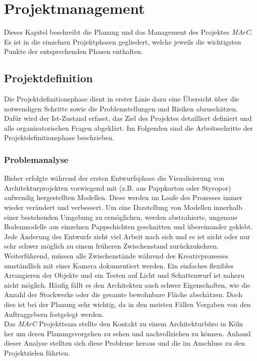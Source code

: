 \section{Projektmanagement} \label{sec:pm}

Dieses Kapitel beschreibt die Planung und das Management des Projektes \textit{MArC}. Es ist in die einzelnen Projektphasen gegliedert, welche jeweils die wichtigsten Punkte der entsprechenden Phasen enthalten.

\subsection{Projektdefinition}
Die Projektdefinitionsphase dient in erster Linie dazu eine Übersicht über die notwendigen Schritte sowie die Problemstellungen und Risiken abzuschätzen. Dafür wird der Ist-Zustand erfasst, das Ziel des Projektes detailliert definiert und alle organisatorischen Fragen abgeklärt. Im Folgenden sind die Arbeitsschritte der Projektdefinitionsphase beschrieben.
\subsubsection{Problemanalyse}
\label{sec:problemanalyse}
Bisher erfolgte während der ersten Entwurfsphase die Visualisierung von Architekturprojekten vorwiegend mit (z.B. aus Pappkarton oder Styropor) aufwendig hergestellten Modellen. Diese werden im Laufe des Prozesses immer wieder verändert und verbessert.
Um eine Darstellung von Modellen innerhalb einer bestehenden Umgebung zu ermöglichen, werden abstrahierte, ungenaue Bodenmodelle aus einzelnen Pappschichten geschnitten und übereinander geklebt. Jede Änderung des Entwurfs zieht viel Arbeit nach sich und es ist nicht oder nur sehr schwer möglich zu einem früheren Zwischenstand zurückzukehren. Weiterführend, müssen alle Zwischenstände während des Kreativprozesses umständlich mit einer Kamera dokumentiert werden. Ein einfaches flexibles Arrangieren der Objekte und ein Testen auf Licht und Schattenwurf ist nahezu nicht möglich. Häufig fällt es den Architekten auch schwer Eigenschaften, wie die Anzahl der Stockwerke oder die gesamte bewohnbare Fläche abschätzen. Doch dies ist bei der Planung sehr wichtig, da in den meisten Fällen Vorgaben von den Auftraggebern festgelegt werden.\\
Das \textit{MArC} Projektteam stellte den Kontakt zu einem Architekturbüro in Köln her um deren Planungsvorgehen zu sehen und nachvollziehen zu können. Anhand dieser Analyse stellten sich diese Probleme heraus und die im Anschluss zu den Projektzielen führten.


